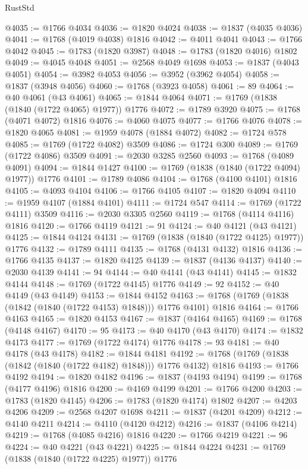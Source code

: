 \begin{lexlean}{RustStd}
\begin{coremodule}
@4035 := @1766 @4034
@4036 := @1820 @4024
@4038 := @1837 (@4035 @4036)
@4041 := @1768 (@4019 @4038) @1816
@4042 := @4011 @4041
@4043 := @1766 @4042
@4045 := @1783 (@1820 @3987)
@4048 := @1783 (@1820 @4016) @1802
@4049 := @4045 @4048
@4051 := @2568 @4049 @1698
@4053 := @1837 (@4043 @4051)
@4054 := @3982 @4053
@4056 := @3952 (@3962 @4054)
@4058 := @1837 (@3948 @4056)
@4060 := @1768 (@3923 @4058)
@4061 := 89
@4064 := @40 @4061 (@43 @4061)
@4065 := @1844 @4064
@4071 := @1769 (@1838 (@1840 (@1722 @4065) @1977)) @1776
@4072 := @1789 @3920
@4075 := @1768 (@4071 @4072) @1816
@4076 := @4060 @4075
@4077 := @1766 @4076
@4078 := @1820 @4065
@4081 := @1959 @4078 (@1884 @4072)
@4082 := @1724 @578
@4085 := @1769 (@1722 @4082) @3509
@4086 := @1724 @300
@4089 := @1769 (@1722 @4086) @3509
@4091 := @2030 @3285 @2560
@4093 := @1768 (@4089 @4091)
@4094 := @1844 @1427
@4100 := @1769 (@1838 (@1840 (@1722 @4094) @1977)) @1776
@4101 := @1789 @4086
@4104 := @1768 (@4100 @4101) @1816
@4105 := @4093 @4104
@4106 := @1766 @4105
@4107 := @1820 @4094
@4110 := @1959 @4107 (@1884 @4101)
@4111 := @1724 @547
@4114 := @1769 (@1722 @4111) @3509
@4116 := @2030 @3305 @2560
@4119 := @1768 (@4114 @4116) @1816
@4120 := @1766 @4119
@4121 := 91
@4124 := @40 @4121 (@43 @4121)
@4125 := @1844 @4124
@4131 := @1769 (@1838 (@1840 (@1722 @4125) @1977)) @1776
@4132 := @1789 @4111
@4135 := @1768 (@4131 @4132) @1816
@4136 := @1766 @4135
@4137 := @1820 @4125
@4139 := @1837 (@4136 @4137)
@4140 := @2030 @4139
@4141 := 94
@4144 := @40 @4141 (@43 @4141)
@4145 := @1832 @4144
@4148 := @1769 (@1722 @4145) @1776
@4149 := 92
@4152 := @40 @4149 (@43 @4149)
@4153 := @1844 @4152
@4163 := @1768 (@1769 (@1838 (@1842 (@1840 (@1722 @4153) @1848))) @1776 @4101) @1816
@4164 := @1766 @4163
@4165 := @1820 @4153
@4167 := @1837 (@4164 @4165)
@4169 := @1768 (@4148 @4167)
@4170 := 95
@4173 := @40 @4170 (@43 @4170)
@4174 := @1832 @4173
@4177 := @1769 (@1722 @4174) @1776
@4178 := 93
@4181 := @40 @4178 (@43 @4178)
@4182 := @1844 @4181
@4192 := @1768 (@1769 (@1838 (@1842 (@1840 (@1722 @4182) @1848))) @1776 @4132) @1816
@4193 := @1766 @4192
@4194 := @1820 @4182
@4196 := @1837 (@4193 @4194)
@4199 := @1768 (@4177 @4196) @1816
@4200 := @4169 @4199
@4201 := @1766 @4200
@4203 := @1783 (@1820 @4145)
@4206 := @1783 (@1820 @4174) @1802
@4207 := @4203 @4206
@4209 := @2568 @4207 @1698
@4211 := @1837 (@4201 @4209)
@4212 := @4140 @4211
@4214 := @4110 (@4120 @4212)
@4216 := @1837 (@4106 @4214)
@4219 := @1768 (@4085 @4216) @1816
@4220 := @1766 @4219
@4221 := 96
@4224 := @40 @4221 (@43 @4221)
@4225 := @1844 @4224
@4231 := @1769 (@1838 (@1840 (@1722 @4225) @1977)) @1776

\end{coremodule}
\end{lexlean}
